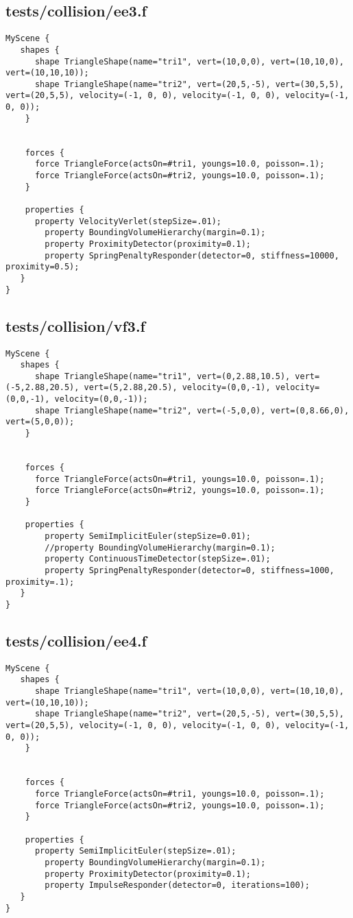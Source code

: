 \subsection*{tests/collision/ee3.f}
\begin{lstlisting}
MyScene {
   shapes {
      shape TriangleShape(name="tri1", vert=(10,0,0), vert=(10,10,0), vert=(10,10,10));
      shape TriangleShape(name="tri2", vert=(20,5,-5), vert=(30,5,5), vert=(20,5,5), velocity=(-1, 0, 0), velocity=(-1, 0, 0), velocity=(-1, 0, 0));
    }

    
    forces {
      force TriangleForce(actsOn=#tri1, youngs=10.0, poisson=.1);
      force TriangleForce(actsOn=#tri2, youngs=10.0, poisson=.1);
    }

    properties { 
      property VelocityVerlet(stepSize=.01);
        property BoundingVolumeHierarchy(margin=0.1);
        property ProximityDetector(proximity=0.1);
        property SpringPenaltyResponder(detector=0, stiffness=10000, proximity=0.5);
   }
}
\end{lstlisting}

\subsection*{tests/collision/vf3.f}
\begin{lstlisting}
MyScene {
   shapes {
      shape TriangleShape(name="tri1", vert=(0,2.88,10.5), vert=(-5,2.88,20.5), vert=(5,2.88,20.5), velocity=(0,0,-1), velocity=(0,0,-1), velocity=(0,0,-1));
      shape TriangleShape(name="tri2", vert=(-5,0,0), vert=(0,8.66,0), vert=(5,0,0));
    }

    
    forces {
      force TriangleForce(actsOn=#tri1, youngs=10.0, poisson=.1);
      force TriangleForce(actsOn=#tri2, youngs=10.0, poisson=.1);
    }

    properties { 
        property SemiImplicitEuler(stepSize=0.01);
        //property BoundingVolumeHierarchy(margin=0.1);
        property ContinuousTimeDetector(stepSize=.01);
        property SpringPenaltyResponder(detector=0, stiffness=1000, proximity=.1);
   }
}
\end{lstlisting}

\subsection*{tests/collision/ee4.f}
\begin{lstlisting}
MyScene {
   shapes {
      shape TriangleShape(name="tri1", vert=(10,0,0), vert=(10,10,0), vert=(10,10,10));
      shape TriangleShape(name="tri2", vert=(20,5,-5), vert=(30,5,5), vert=(20,5,5), velocity=(-1, 0, 0), velocity=(-1, 0, 0), velocity=(-1, 0, 0));
    }

    
    forces {
      force TriangleForce(actsOn=#tri1, youngs=10.0, poisson=.1);
      force TriangleForce(actsOn=#tri2, youngs=10.0, poisson=.1);
    }

    properties { 
      property SemiImplicitEuler(stepSize=.01);
        property BoundingVolumeHierarchy(margin=0.1);
        property ProximityDetector(proximity=0.1);
        property ImpulseResponder(detector=0, iterations=100);
   }
}
\end{lstlisting}


